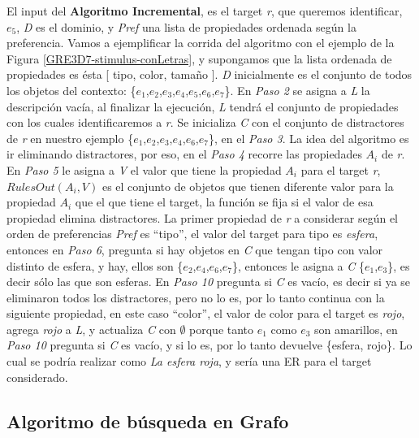 El input del {\bf Algoritmo Incremental}, es el target \emph{r}, que queremos identificar, $e_{5}$, \emph{D} es el dominio, y \emph{Pref} una lista de propiedades ordenada seg\'un la preferencia. Vamos a ejemplificar la corrida del algoritmo con el ejemplo de la Figura \ref{GRE3D7-stimulus-conLetras}, y supongamos que la lista ordenada de propiedades es \'esta [ tipo, color, tama\~no ]. \emph{D} inicialmente es el conjunto de todos los objetos del contexto: \{$e_{1}$,$e_{2}$,$e_{3}$,$e_{4}$,$e_{5}$,$e_{6}$,$e_{7}$\}.
En {\it Paso 2} se asigna a \emph{L} la descripci\'on vac\'{i}a, al finalizar la ejecuci\'on, \emph{L} tendr\'a el conjunto de propiedades con los cuales identificaremos a \emph{r}. Se inicializa \emph{C} con el conjunto de distractores de \emph{r} en nuestro ejemplo \{$e_{1}$,$e_{2}$,$e_{3}$,$e_{4}$,$e_{6}$,$e_{7}$\}, en el {\it Paso 3}. 
La idea del algoritmo es ir eliminando distractores, por eso, en el {\it Paso 4} recorre las propiedades $A_{i}$ de \emph{r}. En {\it Paso 5} le asigna a \emph{V} el valor que tiene la propiedad $A_{i}$ para el target \emph{r}, $RulesOut(A_{i},V)$ es el conjunto de objetos que tienen diferente valor para la propiedad $A_{i}$ que el que tiene el  target, la funci\'on se fija si el valor de esa propiedad elimina distractores. La primer propiedad de \emph{r} a considerar seg\'un el orden de preferencias \emph{Pref} es ``tipo'', el valor del target para tipo es {\it esfera}, entonces en {\it Paso 6}, pregunta si hay objetos en \emph{C} que tengan tipo con valor distinto de esfera, y hay, ellos son \{$e_{2}$,$e_{4}$,$e_{6}$,$e_{7}$\}, entonces le asigna a \emph{C} \{$e_{1}$,$e_{3}$\}, es decir s\'olo las que son esferas. En {\it Paso 10} pregunta si \emph{C} es vac\'io, es decir si ya se eliminaron todos los distractores, pero no lo es, por lo tanto continua con la siguiente propiedad, en este caso ``color'', el valor de color para el target es {\it rojo}, agrega {\it rojo} a \emph{L}, y actualiza \emph{C} con $\emptyset$ porque tanto $e_{1}$ como $e_{3}$ son amarillos, en {\it Paso 10} pregunta si \emph{C} es vac\'io, y si lo es, por lo tanto devuelve \{esfera, rojo\}. Lo cual se podr\'ia realizar como {\it La esfera roja}, y ser\'ia una ER para el target considerado.


\subsection{Algoritmo de b\'usqueda en Grafo}
\label{graph}

%





